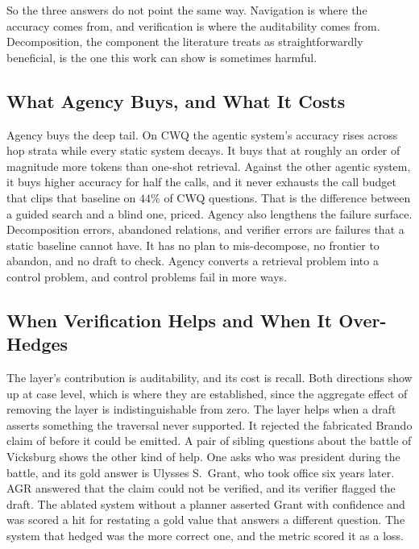 So the three answers do not point the same way. Navigation is where the accuracy
comes from, and verification is where the auditability comes from.
Decomposition, the component the literature treats as straightforwardly
beneficial, is the one this work can show is sometimes harmful.

\subsection{What Agency Buys, and What It Costs}

Agency buys the deep tail. On CWQ the agentic system's accuracy rises across hop
strata while every static system decays. It buys that at roughly an order of
magnitude more tokens than one-shot retrieval. Against the other agentic system,
it buys higher accuracy for half the calls, and it never exhausts the call
budget that clips that baseline on $44\%$ of CWQ questions. That is the
difference between a guided search and a blind one, priced. Agency also
lengthens the failure surface. Decomposition errors, abandoned relations, and
verifier errors are failures that a static baseline cannot have. It has no plan
to mis-decompose, no frontier to abandon, and no draft to check. Agency converts
a retrieval problem into a control problem, and control problems fail in more
ways.

\subsection{When Verification Helps and When It
\texorpdfstring{\mbox{Over-Hedges}}{Over-Hedges}}

The layer's contribution is auditability, and its cost is recall. Both
directions show up at case level, which is where they are established, since the
aggregate effect of removing the layer is indistinguishable from zero. The layer
helps when a draft asserts something the traversal never supported. It rejected
the fabricated Brando claim of  before it could be emitted. A
pair of sibling questions about the battle of Vicksburg shows the other kind of
help. One asks who was president during the battle, and its gold answer is
Ulysses S.~Grant, who took office six years later. AGR answered that the claim
could not be verified, and its verifier flagged the draft. The ablated system
without a planner asserted Grant with confidence and was scored a hit for
restating a gold value that answers a different question. The system that hedged
was the more correct one, and the metric scored it as a loss.

